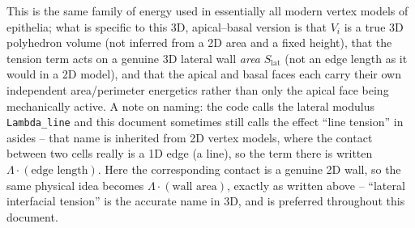 \documentclass[11pt,a4paper]{report}
\begin{document}
This is the same family of energy used in essentially all modern vertex
models of epithelia; what is specific to this 3D, apical--basal version
is that $V_i$ is a true 3D polyhedron volume (not inferred from a 2D
area and a fixed height), that the tension term acts on a genuine
3D lateral wall \emph{area} $S_{\mathrm{lat}}$ (not an edge length as it
would in a 2D model), and that the apical and basal faces each carry
their own independent area/perimeter energetics rather than only the
apical face being mechanically active. A note on naming: the code
calls the lateral modulus \texttt{Lambda\_line} and this document
sometimes still calls the effect ``line tension'' in asides -- that
name is inherited from 2D vertex models, where the contact between two
cells really is a 1D edge (a line), so the term there is written
$\Lambda\cdot(\text{edge length})$. Here the corresponding contact is
a genuine 2D wall, so the same physical idea becomes
$\Lambda\cdot(\text{wall area})$, exactly as written above -- ``lateral
interfacial tension'' is the accurate name in 3D, and is preferred
throughout this document.
\end{document}
